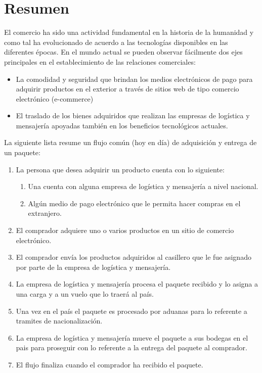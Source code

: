 \documentclass[12pt,a4paper]{article}
\begin{document}
\section{Resumen}
El comercio ha sido una actividad fundamental en la historia de la humanidad y como tal ha evolucionado de acuerdo a las tecnologías disponibles en las diferentes épocas. 
En el mundo actual se pueden observar fácilmente dos ejes principales en el establecimiento de las relaciones comerciales: 
\begin{itemize}
\item La comodidad y seguridad que brindan los medios electrónicos de pago para adquirir productos en el exterior a través de sitios web de tipo comercio electrónico (e-commerce)
\item El traslado de los bienes adquiridos que realizan las empresas de logística y mensajería apoyadas también en los beneficios tecnológicos actuales.
\end{itemize} 
La siguiente lista resume un flujo común (hoy en día) de adquisición y entrega de un paquete:
\begin{enumerate}
\item La persona que desea adquirir un producto cuenta con lo siguiente:
\begin{enumerate}
\item Una cuenta con alguna empresa de logística y mensajería a nivel nacional.
\item Algún medio de pago electrónico que le permita hacer compras en el extranjero.
\end{enumerate}
\item El comprador adquiere uno o varios productos en un sitio de comercio electrónico.
\item El comprador envía los productos adquiridos al casillero que le fue asignado por parte de la empresa de logística y mensajería.
\item La empresa de logística y mensajería procesa el paquete recibido y lo asigna a una carga y a un vuelo que lo traerá al país.
\item Una vez en el país el paquete es procesado por aduanas para lo referente a tramites de nacionalización.
\item La empresa de logística y mensajería mueve el paquete a sus bodegas en el pais para proseguir con lo referente a la entrega del paquete al comprador.
\item El flujo finaliza cuando el comprador ha recibido el paquete.
\end{enumerate}
\end{document}
